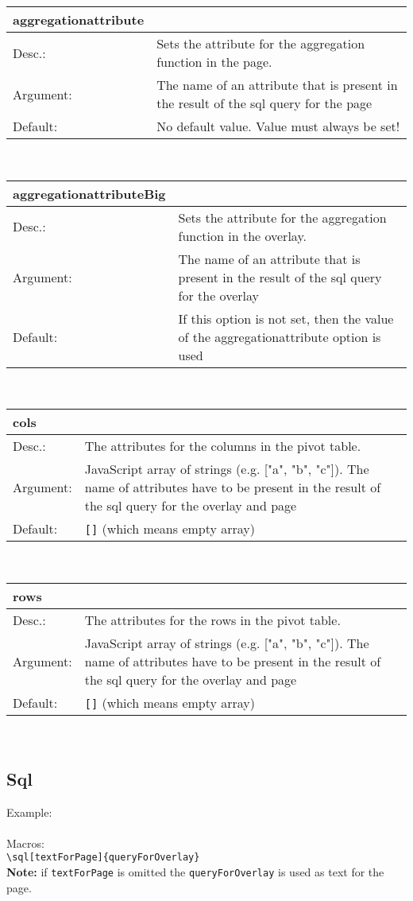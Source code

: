 \documentclass[11pt]{scrartcl}
\def\a{5cm}
\def\b{10.5cm}
\def\option#1#2#3#4{%
\noindent \begin{tabular}{|p{\a}|p{\b}|}
\hline
\textbf{#1} & \\
\hline
Desc.: & #2 \\
\hline
Argument: & #3\\
\hline
Default:& #4\\
\hline
\end{tabular} \\[4pt]%
}
\begin{document}
\option
{aggregationattribute}
{Sets the attribute for the aggregation function in the page.}
{The name of an attribute that is present in the result of the sql query for the page}
{No default value. Value must always be set!}

\option
{aggregationattributeBig}
{Sets the attribute for the aggregation function in the overlay.}
{The name of an attribute that is present in the result of the sql query for the overlay}
{If this option is not set, then the value of the aggregationattribute option is used}

\option
{cols}
{The attributes for the columns in the pivot table.}
{JavaScript array of strings (e.g. ["a", "b", "c"]). The name of attributes have to be present in the result of the sql query for the overlay and page}
{\texttt{[]} (which means empty array)}

\option
{rows}
{The attributes for the rows in the pivot table.}
{JavaScript array of strings (e.g. ["a", "b", "c"]). The name of attributes have to be present in the result of the sql query for the overlay and page}
{\texttt{[]} (which means empty array)}

\newpage
\subsection{Sql}
Example:\\[3pt]
\\[3pt]
%
\noindent Macros: \\[3pt]
\verb|\sql[textForPage]{queryForOverlay}| \\
\textbf{Note:} if \verb|textForPage| is omitted the \verb|queryForOverlay| is used as text for the page.\\[8pt]
\end{document}
